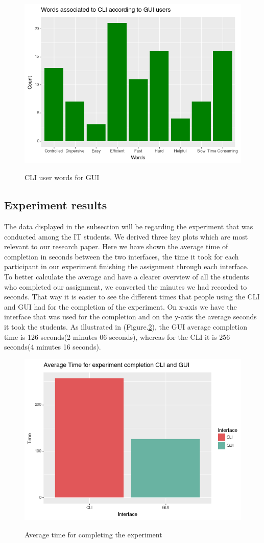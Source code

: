 \documentclass[]{report}
\begin{document}
	
	\begin{figure}[H]
		\centering
		\includegraphics[width=0.75\linewidth]{WordsCLIFromGUI}\\
		\caption{CLI user words for GUI}
		\label{fig: 18}
	\end{figure}
\newpage

\subsection{Experiment results}
The data displayed in the subsection will be regarding the experiment that was conducted among the IT students. We derived three key plots which are most relevant to our research paper. Here we have shown the average time of completion in seconds between the two interfaces, the time it took for each participant in our experiment finishing the assignment through each interface.\\

		
	To better calculate the average and have a clearer overview of all the students who completed our assignment, we converted the minutes we had recorded to seconds. That way it is easier to see the different times that people using the CLI and GUI had for the completion of the experiment. On x-axis we have the interface that was used for the completion and on the y-axis the average seconds it took the students. As illustrated in (Figure.\ref{fig: 19}), the GUI average completion time is 126 seconds(2 minutes 06 seconds), whereas for the CLI it is 256 seconds(4 minutes 16 seconds).

\begin{figure}[H]
	\centering
	\includegraphics[width=0.75\linewidth]{ExperimentAverageTime}\\
	\caption{Average time for completing the experiment}
	\label{fig: 19}
\end{figure}
\end{document}
